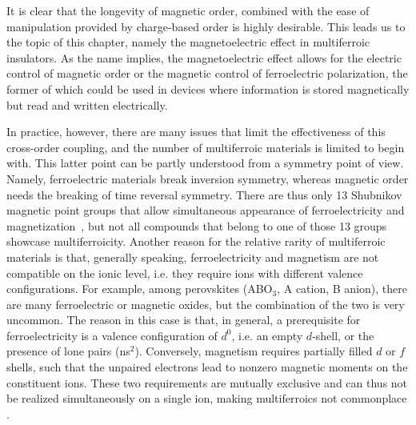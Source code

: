 It is clear that the longevity of magnetic order, combined with the ease of manipulation provided by charge-based order is highly desirable.
This leads us to the topic of this chapter, namely the magnetoelectric effect in multiferroic insulators.
As the name implies, the magnetoelectric effect allows for the electric control of magnetic order or the magnetic control of ferroelectric polarization\cite{Spaldin2019,Khomskii2009,Fiebig2005,Fiebig2016,Cheong2007}, the former of which could be used in devices where information is stored magnetically but read and written electrically.

In practice, however, there are many issues that limit the effectiveness of this cross-order coupling, and the number of multiferroic materials is limited to begin with.
This latter point can be partly understood from a symmetry point of view.
Namely, ferroelectric materials break inversion symmetry, whereas magnetic order needs the breaking of time reversal symmetry.
There are thus only 13 Shubnikov magnetic point groups that allow simultaneous appearance of ferroelectricity and magnetization~\cite{Wang2009}, but not all compounds that belong to one of those 13 groups showcase multiferroicity.
Another reason for the relative rarity of multiferroic materials is that, generally speaking, ferroelectricity and magnetism are not compatible on the ionic level, i.e. they require ions with different valence configurations\cite{Spaldin2019}.
For example, among perovskites (ABO$_3$, A cation, B anion), there are many ferroelectric or magnetic oxides, but the combination of the two is very uncommon.
The reason in this case is that, in general, a prerequisite for ferroelectricity is a valence configuration of $d^0$, i.e. an empty $d$-shell, or the presence of lone pairs (ns$^2$).
Conversely, magnetism requires partially filled $d$ or $f$ shells, such that the unpaired electrons lead to nonzero magnetic moments on the constituent ions.
These two requirements are mutually exclusive and can thus not be realized simultaneously on a single ion, making multiferroics not commonplace .

